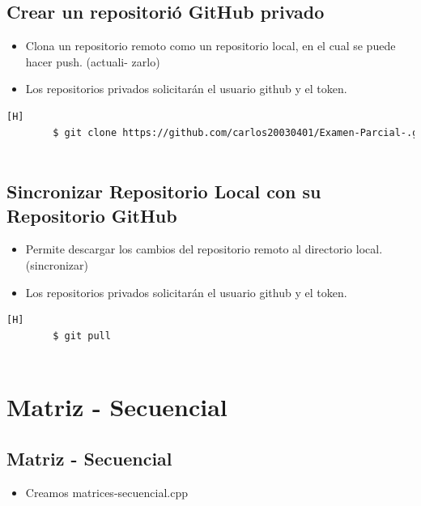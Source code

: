 \documentclass{article}
\begin{document}
	\subsection{Crear un repositorió GitHub privado}

 	\begin{itemize}	
		\item Clona un repositorio remoto como un repositorio local, en el cual se puede hacer push. (actuali-
zarlo)
		\item Los repositorios privados solicitarán el usuario github y el token.
	\end{itemize}
 
 	\begin{lstlisting}[language=bash,caption={Git clone}][H]
		$ git clone https://github.com/carlos20030401/Examen-Parcial-.git
           
	\end{lstlisting}
 
 	\subsection{Sincronizar Repositorio Local con su Repositorio GitHub}
   	\begin{itemize}	
		\item Permite descargar los cambios del repositorio remoto al directorio local. (sincronizar)
 		\item Los repositorios privados solicitarán el usuario github y el token.

	\end{itemize}
	\begin{lstlisting}[language=bash,caption={git pull}][H]
		$ git pull
  
	\end{lstlisting}
	\section{Matriz - Secuencial}
	\subsection{Matriz - Secuencial}
	\begin{itemize}	
		\item Creamos matrices-secuencial.cpp\end{itemize}	
		
\end{document}
